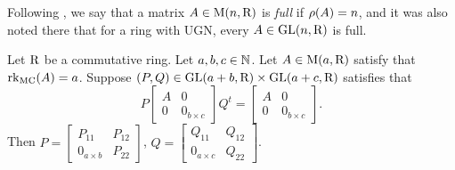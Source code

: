 Following \cite[pp. 248]{Coh85}, we say that a matrix $A\in\mathrm{M}(n, \mathrm{R})$ is \emph{full} if $\rho(A)=n$, and it was also noted there that for a ring with UGN, every $A\in \mathrm{GL}(n, \mathrm{R})$ is full. 

\begin{lemma}\label{lem:upper-tri}
	Let $\mathrm{R}$ be a commutative ring. Let $a, b, c\in \mathbb{N}$. Let $A\in \mathrm{M}(a, \mathrm{R})$ satisfy that $\mathrm{rk}_{\textrm{MC}}(A)=a$. Suppose $(P, Q)\in\mathrm{GL}(a+b, \mathrm{R})\times\mathrm{GL}(a+c, \mathrm{R})$ satisfies that 
	\begin{equation}\label{eq:upper-tri}
		P\begin{bmatrix}
			A & 0 \\
			0 & 0_{b\times c}
		\end{bmatrix}Q^t=\begin{bmatrix}
			A & 0 \\
			0 & 0_{b\times c}
		\end{bmatrix}.
	\end{equation} Then $P=\begin{bmatrix}
		P_{11} & P_{12}\\
		0_{a\times b} & P_{22}
	\end{bmatrix}$, $Q=\begin{bmatrix}
		Q_{11} & Q_{12}\\
		0_{a\times c} & Q_{22}
	\end{bmatrix}$.
\end{lemma}

